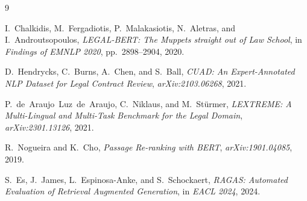 \documentclass[12pt,a4paper]{report}
\begin{document}
\newpage
\begin{thebibliography}{9}

I.~Chalkidis, M.~Fergadiotis, P.~Malakasiotis, N.~Aletras, and I.~Androutsopoulos,
\textit{LEGAL-BERT: The Muppets straight out of Law School},
in \textit{Findings of EMNLP 2020}, pp.\ 2898--2904, 2020.

D.~Hendrycks, C.~Burns, A.~Chen, and S.~Ball,
\textit{CUAD: An Expert-Annotated NLP Dataset for Legal Contract Review},
\textit{arXiv:2103.06268}, 2021.

P.~de~Araujo~Luz~de~Araujo, C.~Niklaus, and M.~Stürmer,
\textit{LEXTREME: A Multi-Lingual and Multi-Task Benchmark for the Legal Domain},
\textit{arXiv:2301.13126}, 2021.

R.~Nogueira and K.~Cho,
\textit{Passage Re-ranking with BERT},
\textit{arXiv:1901.04085}, 2019.

S.~Es, J.~James, L.~Espinosa-Anke, and S.~Schockaert,
\textit{RAGAS: Automated Evaluation of Retrieval Augmented Generation},
in \textit{EACL 2024}, 2024.

\end{thebibliography}
\end{document}
